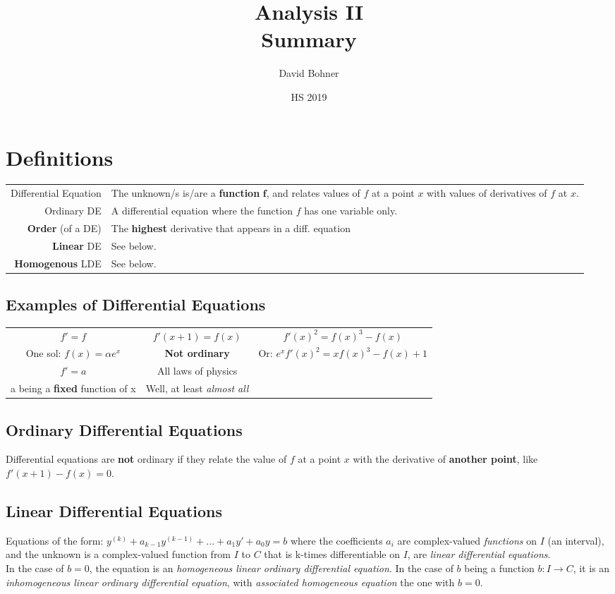 \documentclass[12pt,a4paper]{article}
\author{David Bohner}
\title{Analysis II \\ Summary}
\date{HS 2019}
\begin{document}
\maketitle
\tableofcontents
\newpage
\section{Definitions}
\begin{tabularx}{\linewidth}{r X}
Differential Equation & The unknown/s is/are a \textbf{function} $\mathbf{f}$, and relates values of $f$ at a point $x$ with values of derivatives of $f$ at $x$.\\
Ordinary DE & A differential equation where the function $f$ has one variable only.\\
\textbf{Order} (of a DE) & The \textbf{highest} derivative that appears in a diff. equation\\
\textbf{Linear} DE & See below.\\
\textbf{Homogenous} LDE & See below.
\end{tabularx}

\subsection{Examples of Differential Equations}
\begin{tabular}{|c|c|c|} \hline
$f' = f$ & $f'(x+1) = f(x)$ & $f'(x)^2 = f(x)^3 - f(x)$\\
One sol: $f(x) = \alpha e^x$ & \textbf{Not ordinary} & Or: $e^x f'(x)^2 = x f(x)^3 - f(x) + 1$\\ \hline
$f'=a$ & All laws of physics\\
a being a \textbf{fixed} function of x & Well, at least \textit{almost all}\\ \hline
\end{tabular}

\subsection{Ordinary Differential Equations}
Differential equations are \textbf{not} ordinary if they relate the value of $f$ at a point $x$ with the derivative of \textbf{another point}, like $f'(x+1) - f(x) = 0$.

\subsection{Linear Differential Equations}
Equations of the form: $y^{(k)} + a_{k-1}y^{(k-1)} + ... + a_1y' + a_0y = b$ where the coefficients $a_i$ are complex-valued \textit{functions} on $I$ (an interval), and the unknown is a complex-valued function from $I$ to $C$ that is k-times differentiable on $I$, are \textit{linear differential equations}.\\
In the case of $b = 0$, the equation is an \textit{homogeneous linear ordinary differential equation}.
In the case of $b$ being a function $b: I \to C$, it is an \textit{inhomogeneous linear ordinary differential equation}, with \textit{associated homogeneous equation} the one with $b = 0$.
\end{document}
